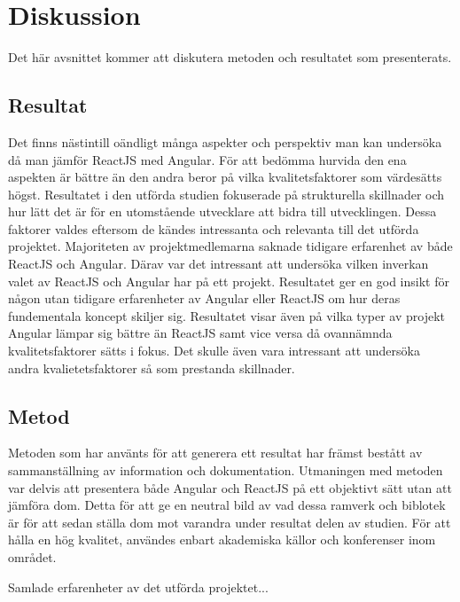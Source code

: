 \section{Diskussion}
\label{sec:axel-discussion}
Det här avsnittet kommer att diskutera metoden och resultatet som presenterats. 

\subsection{Resultat}
\label{subsec:axel-discussion-results}
Det finns nästintill oändligt många aspekter och perspektiv man kan undersöka då man jämför ReactJS med Angular. För att bedömma hurvida den ena aspekten är bättre än den andra beror på vilka kvalitetsfaktorer som värdesätts högst. Resultatet i den utförda studien fokuserade på strukturella skillnader och hur lätt det är för en utomstående utvecklare att bidra till utvecklingen. Dessa faktorer valdes eftersom de kändes intressanta och relevanta till det utförda projektet. Majoriteten av projektmedlemarna saknade tidigare erfarenhet av både ReactJS och Angular. Därav var det intressant att undersöka vilken inverkan valet av ReactJS och Angular har på ett projekt. Resultatet ger en god insikt för någon utan tidigare erfarenheter av Angular eller ReactJS om hur deras fundementala koncept skiljer sig. Resultatet visar även på vilka typer av projekt Angular lämpar sig bättre än ReactJS samt vice versa då ovannämnda kvalitetsfaktorer sätts i fokus. Det skulle även vara intressant att undersöka andra kvalietetsfaktorer så som prestanda skillnader. 

\subsection{Metod}
\label{subsec:axel-discussion-method}
Metoden som har använts för att generera ett resultat har främst bestått av sammanställning av information och dokumentation. Utmaningen med metoden var delvis att presentera både Angular och ReactJS på ett objektivt sätt utan att jämföra  dom. Detta för att ge en neutral bild av vad dessa ramverk och biblotek är för att sedan ställa dom mot varandra under resultat delen av studien. För att hålla en hög kvalitet, användes enbart akademiska källor och konferenser inom området.

Samlade erfarenheter av det utförda projektet...



